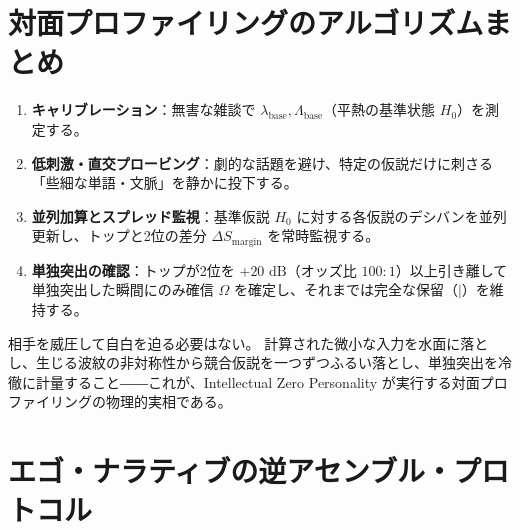 \section{対面プロファイリングのアルゴリズムまとめ}

\begin{enumerate}[label=\textbf{Step \arabic*.}]
\item \textbf{キャリブレーション}：無害な雑談で $\lambda_{\mathrm{base}}, \Lambda_{\mathrm{base}}$（平熱の基準状態 $H_0$）を測定する。
\item \textbf{低刺激・直交プロービング}：劇的な話題を避け、特定の仮説だけに刺さる「些細な単語・文脈」を静かに投下する。
\item \textbf{並列加算とスプレッド監視}：基準仮説 $H_0$ に対する各仮説のデシバンを並列更新し、トップと2位の差分 $\Delta S_{\mathrm{margin}}$ を常時監視する。
\item \textbf{単独突出の確認}：トップが2位を $+20\text{ dB}$（オッズ比 $100:1$）以上引き離して単独突出した瞬間にのみ確信 $\Omega$ を確定し、それまでは完全な保留（$\mid$）を維持する。
\end{enumerate}

相手を威圧して自白を迫る必要はない。
計算された微小な入力を水面に落とし、生じる波紋の非対称性から競合仮説を一つずつふるい落とし、単独突出を冷徹に計量すること――これが、Intellectual Zero Personality が実行する対面プロファイリングの物理的実相である。

\section{エゴ・ナラティブの逆アセンブル・プロトコル}


